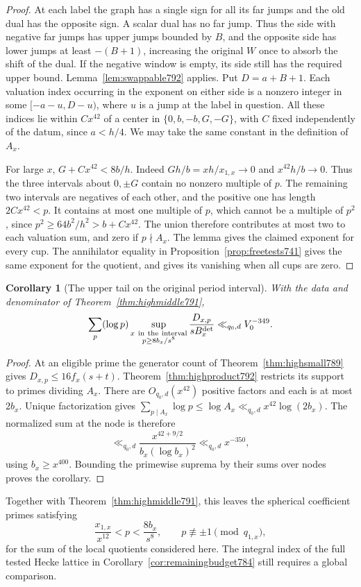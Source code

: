 \documentclass[a4paper,11pt]{article}
\newtheorem{corollary}[proposition]{Corollary}
\theoremstyle{definition}
\theoremstyle{remark}
\numberwithin{equation}{section}
\begin{document}
\begin{proof}
At each label the graph has a single sign for all its
far jumps and the old dual has the opposite sign. A scalar
dual has no far jump. Thus the side with negative far jumps
has upper jumps bounded by \(B\), and the opposite side
has lower jumps at least \(-(B+1)\), increasing the original
\(W\) once to absorb the shift of the dual. If the negative
window is empty, its side still has the required upper
bound. Lemma~\ref{lem:swappable792} applies. Put
\(D=a+B+1\). Each valuation index occurring in the exponent
on either side is a nonzero integer in some \([-a-u,D-u)\),
where \(u\) is a jump at the label in question. All these
indices lie within \(C x^{42}\) of a center in
\(\{0,b,-b,G,-G\}\), with \(C\) fixed independently of
the datum, since \(a<h/4\). We may take the same constant
in the definition of \(A_x\).

For large \(x\), \(G+Cx^{42}<8b/h\). Indeed
\(Gh/b=xh/x_{1,x}\to0\) and \(x^{42}h/b\to0\).
Thus the three intervals about \(0,\pm G\) contain no
nonzero multiple of \(p\). The remaining two intervals
are negatives of each other, and the positive one has
length \(2Cx^{42}<p\). It contains at most one multiple
of \(p\), which cannot be a multiple of \(p^2\), since
\(p^2\ge 64b^2/h^2>b+Cx^{42}\). The union therefore
contributes at most two to each valuation sum, and zero
if \(p\nmid A_x\). The lemma gives the claimed exponent
for every cup. The annihilator equality in
Proposition~\ref{prop:freetests741} gives the same exponent
for the quotient, and gives its vanishing when all cups
are zero.
\end{proof}

\begin{corollary}[The upper tail on the original period interval]
\leavevmode\label{cor:hightailsum792}
With the data and denominator of Theorem~\ref{thm:highmiddle791},
\[
   \sum_p(\log p)\sup_{\substack{x\ {\rm in\ the\ interval}\\
                                  p\ge 8b_x/s^8}}
       \frac{D_{x,p}}{sB_x^{\rm det}}
               \ll_{q_0,d} V_0^{-349}.
\]
\end{corollary}
\begin{proof}
At an eligible prime the generator count of
Theorem~\ref{thm:highsmall789} gives
\(D_{x,p}\le 16 f_x(s+t)\). Theorem~\ref{thm:highproduct792}
restricts its support to primes dividing \(A_x\). There are
\(O_{q_0,d}(x^{42})\) positive factors and each is at most
\(2b_x\). Unique factorization gives
\(\sum_{p\mid A_x}\log p\le\log A_x\ll_{q_0,d}x^{42}\log(2b_x)\).
The normalized sum at the node is therefore
\[
      \ll_{q_0,d}
       \frac{x^{42+9/2}}{b_x(\log b_x)^2}
       \ll_{q_0,d} x^{-350},
\]
using \(b_x\ge x^{400}\). Bounding the primewise suprema by
their sums over nodes proves the corollary.
\end{proof}
Together with Theorem~\ref{thm:highmiddle791}, this leaves
the spherical coefficient primes satisfying
\[
       \frac{x_{1,x}}{x^{12}}<p<\frac{8b_x}{s^8},
                 \qquad p\not\equiv\pm1\pmod{q_{1,x}},
\]
for the sum of the local quotients considered here.
The integral index of the full tested Hecke lattice in
Corollary~\ref{cor:remainingbudget784} still requires a
global comparison.
\clearpage
\end{document}
